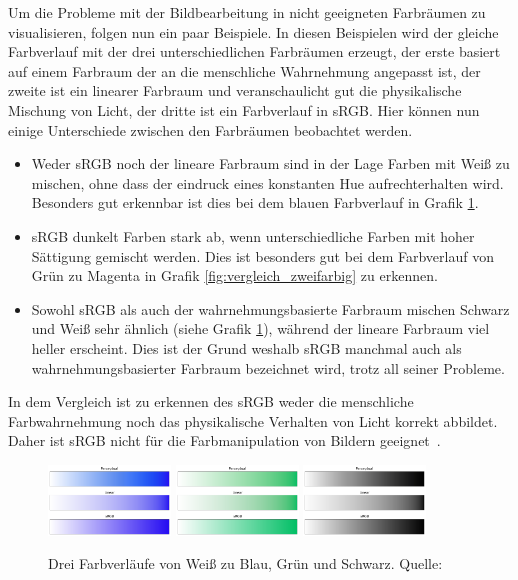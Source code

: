 \documentclass[12pt, a4paper, ngerman]{article}
\begin{document}
Um die Probleme mit der Bildbearbeitung in nicht geeigneten Farbräumen zu visualisieren, folgen nun ein paar Beispiele. 
In diesen Beispielen wird der gleiche Farbverlauf mit der drei unterschiedlichen Farbräumen erzeugt, 
der erste basiert auf einem Farbraum der an die menschliche Wahrnehmung angepasst ist, 
der zweite ist ein linearer Farbraum und veranschaulicht gut die physikalische Mischung von Licht, 
der dritte ist ein Farbverlauf in sRGB.
Hier können nun einige Unterschiede zwischen den Farbräumen beobachtet werden.
\begin{itemize}
  \item Weder sRGB noch der lineare Farbraum sind in der Lage Farben mit Weiß zu mischen, ohne dass der eindruck eines konstanten Hue aufrechterhalten wird. Besonders gut erkennbar ist dies bei dem blauen Farbverlauf in Grafik \ref{fig:vergleich_white}.
  \item sRGB dunkelt Farben stark ab, wenn unterschiedliche Farben mit hoher Sättigung gemischt werden. Dies ist besonders gut bei dem Farbverlauf von Grün zu Magenta in Grafik \ref{fig:vergleich_zweifarbig} zu erkennen.
  \item Sowohl sRGB als auch der wahrnehmungsbasierte Farbraum mischen Schwarz und Weiß sehr ähnlich (siehe Grafik \ref{fig:vergleich_white}), während der lineare Farbraum viel heller erscheint. Dies ist der Grund weshalb sRGB manchmal auch als wahrnehmungsbasierter Farbraum bezeichnet wird, trotz all seiner Probleme.
\end{itemize}
In dem Vergleich ist zu erkennen des sRGB weder die menschliche Farbwahrnehmung 
noch das physikalische Verhalten von Licht korrekt abbildet.
Daher ist sRGB nicht für die Farbmanipulation von Bildern geeignet~\cite{Ottosson_2020}.

\begin{figure}
  \centering
  \includegraphics[width=0.29\textwidth]{Grafiken/Farbverlauf/whiteblue.png}
  \includegraphics[width=0.29\textwidth]{Grafiken/Farbverlauf/whitegreen.png}
  \includegraphics[width=0.29\textwidth]{Grafiken/Farbverlauf/whiteblack.png}
  \caption{Drei Farbverläufe von Weiß zu Blau, Grün und Schwarz. Quelle:~\cite{Ottosson_2020}}
  \label{fig:vergleich_white}
\end{figure}
\end{document}
